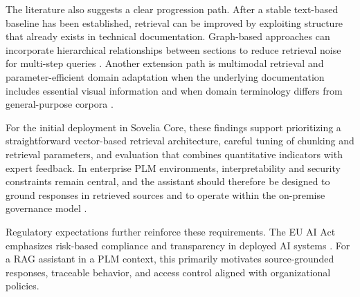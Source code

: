 The literature also suggests a clear progression path. After a stable text-based baseline has been established, retrieval can be improved by exploiting structure that already exists in technical documentation. Graph-based approaches can incorporate hierarchical relationships between sections to reduce retrieval noise for multi-step queries \parencite{knollmeyerDocumentGraphRAGKnowledge2025}. Another extension path is multimodal retrieval and parameter-efficient domain adaptation when the underlying documentation includes essential visual information and when domain terminology differs from general-purpose corpora \parencite{namLoRATunedMultimodalRAG2025}.

For the initial deployment in Sovelia Core, these findings support prioritizing a straightforward vector-based retrieval architecture, careful tuning of chunking and retrieval parameters, and evaluation that combines quantitative indicators with expert feedback. In enterprise PLM environments, interpretability and security constraints remain central, and the assistant should therefore be designed to ground responses in retrieved sources and to operate within the on-premise governance model \parencite{wangArtificialIntelligenceProduct2021}.

Regulatory expectations further reinforce these requirements. The EU AI Act emphasizes risk-based compliance and transparency in deployed AI systems \parencite{sillbergEUAIAct2025}. For a RAG assistant in a PLM context, this primarily motivates source-grounded responses, traceable behavior, and access control aligned with organizational policies.
